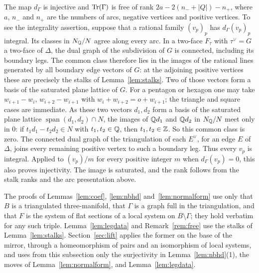 \begin{remark}\label{rem:free}
The map $d_\Gamma$ is injective and $\mathrm{Tr}(\Gamma)$ is free of rank $2a-2(n_-+|Q|)-n_+$, where $a$, $n_-$ and $n_+$ are the
numbers of arcs, negative vertices and positive vertices. To see the integrality assertion, suppose that a rational
family $(v_p)_p$ has $d_\Gamma(v_p)_p$ integral. Its classes in $N_\mathbb Q/N$ agree along every arc. In a two-face $F_\tau$
with $\tau^\vee=G$ a two-face of $\Delta$, the dual graph of the subdivision of $G$ is connected, including its boundary
legs. The common class therefore lies in the images of the rational lines generated by all boundary edge vectors of
$G$: at the adjoining positive vertices these are precisely the stalks of Lemma~\ref{lem:stalks}. Two of those vectors
form a basis of the saturated plane lattice of $G$. For a pentagon or hexagon one may take
$w_{i+1}-w_i$, $w_{i+2}-w_{i+1}$ with $w_i+w_{i+2}=o+w_{i+1}$; the triangle and square cases are immediate.
As these two vectors $d_1,d_2$ form a basis of the saturated plane lattice $\operatorname{span}(d_1,d_2)\cap N$, the images
of $\mathbb Q d_1$ and $\mathbb Q d_2$ in $N_\mathbb Q/N$ meet only in $0$: if $t_1d_1-t_2d_2\in N$ with $t_1,t_2\in\mathbb Q$, then $t_1,t_2\in\mathbb Z$. So
this common class is zero.
The connected dual graph of the triangulation of each $E^\vee$, for an edge $E$ of $\Delta$, joins every remaining
positive vertex to such a boundary leg. Thus every $v_p$ is integral. Applied to $(v_p)/m$ for every positive integer
$m$ when $d_\Gamma(v_p)=0$, this also proves injectivity. The image is saturated, and the rank follows from the stalk
ranks and the arc presentation above.
\end{remark}

\begin{remark}[scope]\label{rem:nbhdscope}
The proofs of Lemmas~\ref{lem:coef}, \ref{lem:nbhd} and~\ref{lem:normalform} use only that $B$ is a triangulated
three-manifold, that $\Gamma$ is a graph full in the triangulation, and that $F$ is the system of flat sections of a
local system on $B\setminus\Gamma$; they hold verbatim for any such triple. Lemma~\ref{lem:legdata} and
Remark~\ref{rem:free} use the stalks of Lemma~\ref{lem:stalks}. Section~\ref{sec:lift} applies the former on the base of
the mirror, through a homeomorphism of pairs and an isomorphism of local systems, and uses from this subsection only
the surjectivity in Lemma~\ref{lem:nbhd}(1), the moves of Lemma~\ref{lem:normalform}, and Lemma~\ref{lem:legdata}.
\end{remark}

